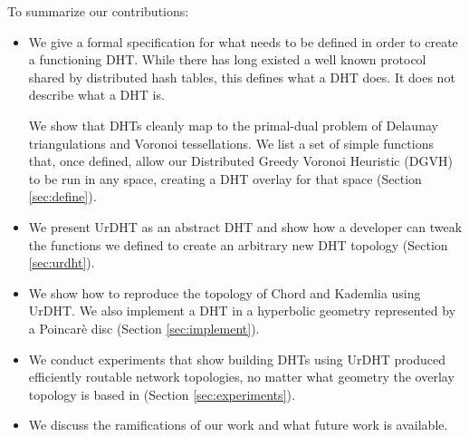 \documentclass[11pt,conference]{IEEEtran}
\begin{document}
%
%

To summarize our contributions:
\begin{itemize}
	\item We give a formal specification for what needs to be defined in order to create a functioning DHT.
	While there has long existed a well known protocol shared by distributed hash tables, this defines what a DHT does.
	It does not describe what a DHT is.
	
	We show that DHTs cleanly map to the primal-dual problem of Delaunay triangulations and Voronoi tessellations.
	We list a set of simple functions that, once defined, allow our Distributed Greedy Voronoi Heuristic (DGVH) to be run in any space, creating a DHT overlay for that space (Section \ref{sec:define}).
	
	\item We present UrDHT as an abstract DHT and show how a developer can tweak the functions we defined to create an arbitrary new DHT topology (Section \ref{sec:urdht}).
	\item We show how to reproduce the topology of Chord and Kademlia using UrDHT.
	We also implement a DHT in a hyperbolic geometry represented  by a Poincar\`{e} disc (Section \ref{sec:implement}).
	\item We conduct experiments that show building DHTs using UrDHT produced efficiently routable network topologies, no matter what geometry the overlay topology  is based in (Section \ref{sec:experiments}). 
	\item We discuss the ramifications of our work and what future work is available.
\end{itemize}
\end{document}
